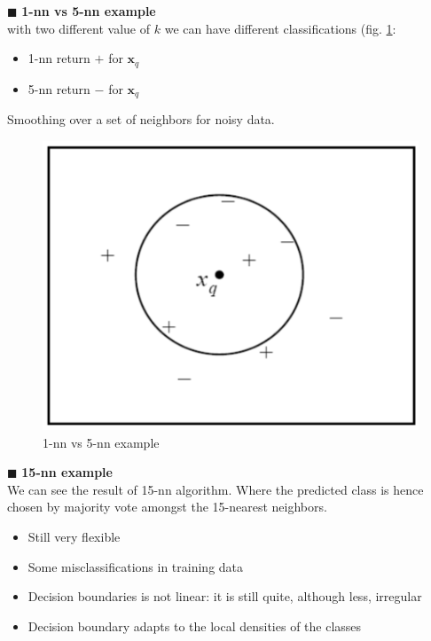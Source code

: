 \documentclass[../main.tex]{subfiles}
\begin{document}
\noindent$\blacksquare$ \textbf{1-nn vs 5-nn example}\\
with two different value of $k$ we can have different classifications (fig. \ref{fig:3_1-nn_vs_5-nn}:
\begin{itemize}
    \item 1-nn return $+$ for $\mathbf{x}_q$
    \item 5-nn return $-$ for $\mathbf{x}_q$
\end{itemize}
Smoothing over a set of neighbors for noisy data.
\begin{figure}[H]
    \centering
    \includegraphics[scale = 0.3]{lectures/3_K_nn/3_1-nn_vs_5-nn.png}
    \caption{1-nn vs 5-nn example}
    \label{fig:3_1-nn_vs_5-nn}
\end{figure}

\noindent$\blacksquare$ \textbf{15-nn example}\\
We can see the result of 15-nn algorithm. Where the predicted class is hence chosen by
majority vote amongst the 15-nearest neighbors.\\

\begin{itemize}
    \item Still very flexible
    \item Some misclassifications in training data
    \item Decision boundaries is not linear: it is still quite, although less, irregular
    \item Decision boundary adapts to the local densities of the classes
\end{itemize}
\end{document}
